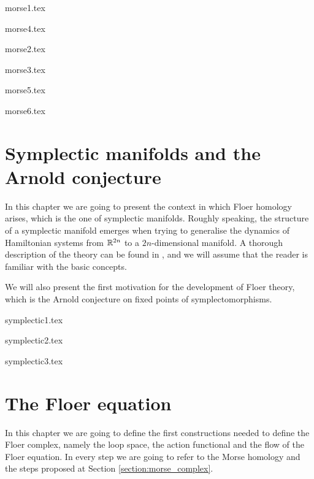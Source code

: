 \documentclass[a4paper,11pt]{book}
\begin{document}
{morse1.tex}

 {morse4.tex}

 {morse2.tex}

 {morse3.tex}

 {morse5.tex}

 {morse6.tex}

 \chapter{Symplectic manifolds and the Arnold conjecture}
In this chapter we are going to present the context in which Floer homology arises, which is the one of symplectic manifolds. Roughly speaking, the structure of a symplectic manifold emerges when trying to generalise the dynamics of Hamiltonian systems from $\mathbb{R}^{2n}$ to a $2n$-dimensional manifold. A thorough description of the theory can be found in \cite{da2001lectures}, and we will assume that the reader is familiar with the basic concepts.

We will also present the first motivation for the development of Floer theory, which is the Arnold conjecture on fixed points of symplectomorphisms.

{symplectic1.tex}

{symplectic2.tex}

{symplectic3.tex}



 \chapter{The Floer equation}
 In this chapter we are going to define the first constructions needed to define the Floer complex, namely the loop space, the action functional and the flow of the Floer equation. In every step we are going to refer to the Morse homology and the steps proposed at Section \ref{section:morse_complex}.
\end{document}
